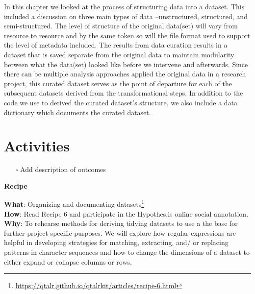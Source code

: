 \documentclass[
  letterpaper,
  DIV=11,
  numbers=noendperiod]{scrreport}
\providecommand{\tightlist}{%
  \setlength{\itemsep}{0pt}\setlength{\parskip}{0pt}}\usepackage{longtable,booktabs,array}
\theoremstyle{definition}
\theoremstyle{remark}
\DeclareRobustCommand{\href}[2]{#2\footnote{\url{#1}}}
\begin{document}
In this chapter we looked at the process of structuring data into a
dataset. This included a discussion on three main types of data
--unstructured, structured, and semi-structured. The level of structure
of the original data(set) will vary from resource to resource and by the
same token so will the file format used to support the level of metadata
included. The results from data curation results in a dataset that is
saved separate from the original data to maintain modularity between
what the data(set) looked like before we intervene and afterwards. Since
there can be multiple analysis approaches applied the original data in a
research project, this curated dataset serves as the point of departure
for each of the subsequent datasets derived from the transformational
steps. In addition to the code we use to derived the curated dataset's
structure, we also include a data dictionary which documents the curated
dataset.

\hypertarget{activities-4}{%
\section*{Activities}\label{activities-4}}


\begin{itemize}
\tightlist
\item[$\square$]
   Add description of outcomes
\end{itemize}

\begin{tcolorbox}[enhanced jigsaw, leftrule=.75mm, bottomrule=.15mm, opacityback=0, breakable, left=2mm, colback=white, toprule=.15mm, arc=.35mm, rightrule=.15mm]

\textbf{ Recipe}

\textbf{What}:
\href{https://qtalr.github.io/qtalrkit/articles/recipe-6.html}{Organizing
and documenting datasets}\\
\textbf{How}: Read Recipe 6 and participate in the Hypothes.is online
social annotation.\\
\textbf{Why}: To rehearse methods for deriving tidying datasets to use a
the base for further project-specific purposes. We will explore how
regular expressions are helpful in developing strategies for matching,
extracting, and/ or replacing patterns in character sequences and how to
change the dimensions of a dataset to either expand or collapse columns
or rows.

\end{tcolorbox}
\end{document}
